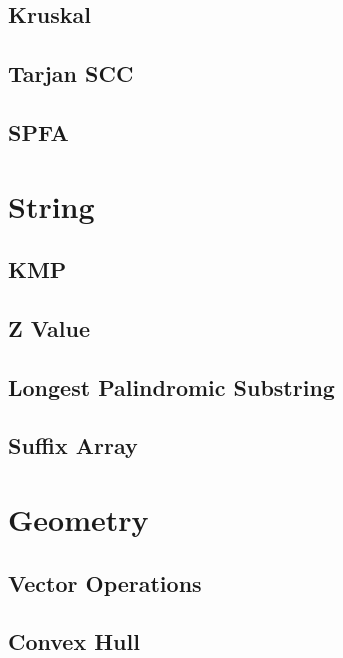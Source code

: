 \documentclass[twocolumn]{article}
\begin{document}
\subsection{Kruskal}


\subsection{Tarjan SCC}


\subsection{SPFA}


\section{String}

\subsection{KMP}


\subsection{Z Value}


\subsection{Longest Palindromic Substring}


\subsection{Suffix Array}


\section{Geometry}

\subsection{Vector Operations}


\subsection{Convex Hull}

\end{document}
